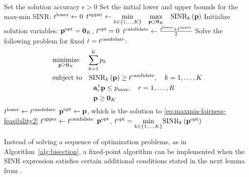 \begin{algorithm}
	\caption{Bisection search algorithm for solving the max-min fairness problem in \eqref{eq:maxmin-fairness-problem-t}.} \label{alg:bisection}
	\begin{algorithmic}[1]
 Set the solution accuracy $\epsilon>0$
\State Set the initial lower and upper bounds for the max-min SINR:
\State $t^{\rm lower}\gets0$
\State $t^{\rm upper}\gets \underset{k\in \{1,\ldots,K\}}{\min}\quad  \underset{\mathbf{p} \geq \mathbf{0}_K}{\max} \quad  \textrm{SINR}_k\left(\mathbf{p}\right)$
\State Initialize solution variables: $\mathbf{p}^{\rm opt}=\mathbf{0}_K$, $t^{\rm opt}=0$
\State $t^{\rm candidate}\gets \frac{t^{\rm lower}+t^{\rm upper}}{2}$
\State Solve the following problem for fixed $t=t^{\rm candidate}$:
\begin{align} \label{eq:maxmin-fairness-feasibility2}
&\underset{\vect{p} \geq \vect{0}_K}{\textrm{minimize}} \quad \, \sum_{k=1}^Kp_k \\
&\textrm{subject to} \quad  \mathrm{SINR}_k\left(\vect{p}\right)\geq t^{\rm candidate}, \quad k=1,\ldots,K \nonumber \\
&\hspace{21mm} \vect{a}_r^{\Ttran}\vect{p}\leq p_{\textrm{max}}, \quad r=1,\ldots,R \nonumber \\
&\hspace{21mm} \vect{p} \geq \vect{0}_K \nonumber
\end{align}
\State $t^{\rm lower}\gets t^{\rm candidate}$
\State $\mathbf{p}^{\rm opt} \gets \mathbf{p}$, which is the solution to \eqref{eq:maxmin-fairness-feasibility2}
\Else
\State  $t^{\rm upper}\gets t^{\rm candidate}$
\EndIf
\EndWhile
		 $\mathbf{p}^{\rm opt}$, $t^{\rm opt}=\underset{k\in \{1,\ldots,K\}}{\min} \textrm{SINR}_k\left(\mathbf{p}^{\rm opt}\right)$
	\end{algorithmic}
	\end{algorithm}

Instead of solving a sequence of optimization problems, as in Algorithm~\ref{alg:bisection}, a fixed-point algorithm can be implemented when the SINR expression satisfies certain additional conditions stated in the next lemma from \cite[Lemma~1, Theorem~1]{Hong2014}. 

\newpage

